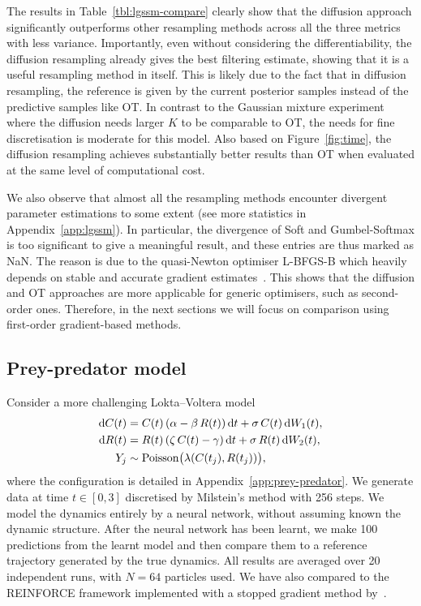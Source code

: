 \documentclass{article}
\begin{document}
The results in Table~\ref{tbl:lgssm-compare} clearly show that the diffusion approach significantly outperforms other resampling methods across all the three metrics with less variance. 
Importantly, even without considering the differentiability, the diffusion resampling already gives the best filtering estimate, showing that it is a useful resampling method in itself. 
This is likely due to the fact that in diffusion resampling, the reference is given by the current posterior samples instead of the predictive samples like OT.
In contrast to the Gaussian mixture experiment where the diffusion needs larger $K$ to be comparable to OT, the needs for fine discretisation is moderate for this model. 
Also based on Figure~\ref{fig:time}, the diffusion resampling achieves substantially better results than OT when evaluated at the same level of computational cost.

We also observe that almost all the resampling methods encounter divergent parameter estimations to some extent (see more statistics in Appendix~\ref{app:lgssm}). 
In particular, the divergence of Soft and Gumbel-Softmax is too significant to give a meaningful result, and these entries are thus marked as NaN. 
The reason is due to the quasi-Newton optimiser L-BFGS-B which heavily depends on stable and accurate gradient estimates~\citep{Xie2020}. 
This shows that the diffusion and OT approaches are more applicable for generic optimisers, such as second-order ones. 
Therefore, in the next sections we will focus on comparison using first-order gradient-based methods.

\subsection{Prey-predator model}
\label{sec:lokta}
Consider a more challenging Lokta--Voltera model 
%
\begin{equation}
    \begin{split}
        \mathop{}\!\mathrm{d} C(t) &= C(t) \, (\alpha - \beta \, R(t)) \mathop{}\!\mathrm{d} t + \sigma \, C(t) \mathop{}\!\mathrm{d} W_{1}(t),\\
        \mathop{}\!\mathrm{d} R(t) &= R(t) \, (\zeta \, C(t) - \gamma) \mathop{}\!\mathrm{d} t + \sigma \, R(t) \mathop{}\!\mathrm{d} W_{2}(t), \\
        Y_j &\sim \mathrm{Poisson}\bigl(\lambda(C(t_j), R(t_j))\bigr),
    \end{split}
\end{equation}
%
where the configuration is detailed in Appendix~\ref{app:prey-predator}.
We generate data at time $t\in[0, 3]$ discretised by Milstein's method with 256 steps. 
We model the dynamics entirely by a neural network, without assuming known the dynamic structure. 
After the neural network has been learnt, we make 100 predictions from the learnt model and then compare them to a reference trajectory generated by the true dynamics. 
All results are averaged over 20 independent runs, with $N=64$ particles used. 
We have also compared to the REINFORCE framework implemented with a stopped gradient method by~\citet{Scibior2021differentiable}.
\end{document}
